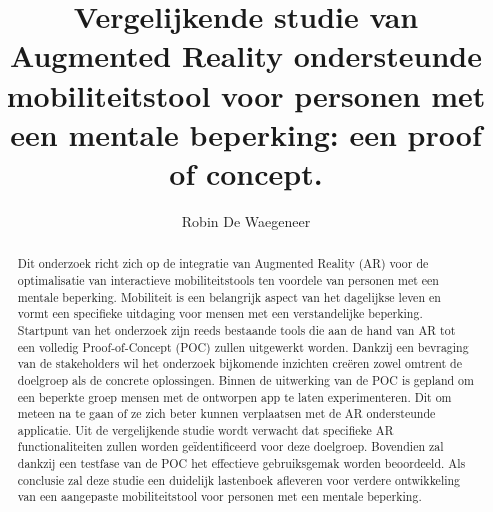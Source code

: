 \documentclass{hogent-article}
\title{Vergelijkende studie van Augmented Reality ondersteunde mobiliteitstool voor personen met een mentale beperking: een proof of concept.}
\author{Robin De Waegeneer}
\begin{document}

\begin{abstract}
    Dit onderzoek richt zich op de integratie van Augmented Reality (AR) voor de optimalisatie van interactieve mobiliteitstools ten voordele van personen met een mentale beperking. 
    Mobiliteit is een belangrijk aspect van het dagelijkse leven en vormt een specifieke uitdaging voor mensen met een verstandelijke beperking. 
    Startpunt van het onderzoek zijn reeds bestaande tools die aan de hand van AR tot een volledig Proof-of-Concept (POC) zullen uitgewerkt worden. 
    Dankzij een bevraging van de stakeholders wil het onderzoek bijkomende inzichten creëren zowel omtrent de doelgroep als de concrete oplossingen. 
    Binnen de uitwerking van de POC is gepland om een beperkte groep mensen met de ontworpen app te laten experimenteren. Dit om meteen na te gaan of ze zich beter kunnen verplaatsen met de AR ondersteunde applicatie. 
    Uit de vergelijkende studie wordt verwacht dat specifieke AR functionaliteiten zullen worden geïdentificeerd voor deze doelgroep. 
    Bovendien zal dankzij een testfase van de POC het effectieve gebruiksgemak worden beoordeeld. 
    Als conclusie zal deze studie een duidelijk lastenboek afleveren voor verdere ontwikkeling van een aangepaste mobiliteitstool voor personen met een mentale beperking.
\end{abstract}

\tableofcontents



\printbibliography[heading=bibintoc]
\end{document}
